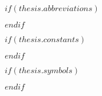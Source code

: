 \listoftables %
% 
$if(thesis.abbreviations)$



$endif$

$if(thesis.constants)$



$endif$


$if(thesis.symbols)$



$endif$


\mainmatter

\pagestyle{thesis} %

\sloppy %


